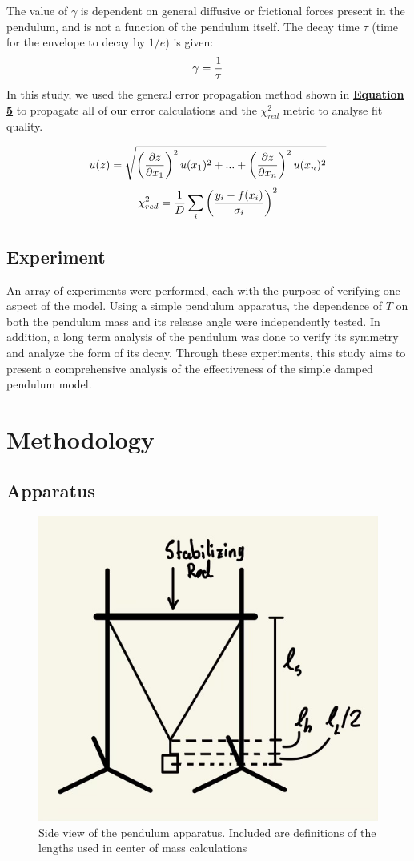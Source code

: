 \documentclass[
	letterpaper
	12pt
]{template}
\newcommand{\bref}[2]{\textbf{\hyperref[#1]{#2}}}
\begin{document}
The value of $\gamma$ is dependent on general diffusive or frictional forces present in the pendulum, and is not a function of the pendulum itself. The decay time $\tau$ (time for the envelope to decay by $1/e$) is given:
\begin{equation}
	\gamma = {1\over \tau}
\end{equation}
In this study, we used the general error propagation method shown in \bref{eqn::genUncert}{Equation 5} \cite{harrison_2023} to propagate all of our error calculations and the $\chi_{red}^2$ metric to analyse fit quality.
\begin{multicols}{2}
\begin{equation}\label{eqn::genUncert}
	u(z) = \sqrt{\left(\pdv{z}{x_1}\right)^2u(x_1)^2 + ... + \left(\pdv{z}{x_n}\right)^2u(x_n)^2}
\end{equation}\break
\begin{equation}
	\chi_{red}^2 = {1\over D}\sum_i\left(\frac{y_i - f(x_i)}{\sigma_i}\right)^2
\end{equation}
\end{multicols}

\subsection{Experiment}
An array of experiments were performed, each with the purpose of verifying one aspect of the model. Using a simple pendulum apparatus, the dependence of $T$ on both the pendulum mass and its release angle were independently tested. In addition, a long term analysis of the pendulum was done to verify its symmetry and analyze the form of its decay. Through these experiments, this study aims to present a comprehensive analysis of the effectiveness of the simple damped pendulum model.

\newpage\section{Methodology}
\subsection{Apparatus}
\setlength\intextsep{0pt}
\begin{figure}\label{side}
	\begin{flushright}
		\vspace{-10pt}
		\includegraphics[width=.35\textwidth]{img/side.jpg}
		\caption{Side view of the pendulum apparatus. Included are definitions of the lengths used in center of mass calculations}

	\end{flushright}
\end{figure}
\end{document}
